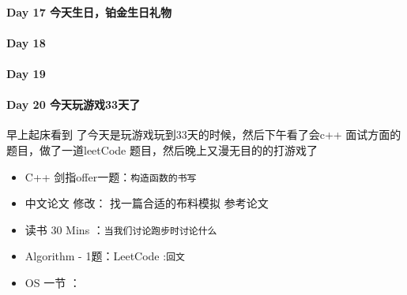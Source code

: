 \documentclass[UTF8,a4paper,8pt]{ctexart}
\begin{document}
 	 \paragraph{Day 17  今天生日，铂金生日礼物   \quad     }
 	 \paragraph{Day 18      \quad     }
 	 \paragraph{Day 19      \quad     }
 	 \paragraph{Day 20  今天玩游戏33天了    \quad     }
 	 
	 	 早上起床看到 了今天是玩游戏玩到33天的时候，然后下午看了会c++ 面试方面的题目，做了一道leetCode 题目，然后晚上又漫无目的的打游戏了
		 	 \begin{itemize}[itemindent = 1em]
		 	 	\renewcommand\labelitemi{\makebox[0pt][l]{$\square$}\hspace{1em}} 
		 	 	\renewcommand\labelitemi{\makebox[0pt][l]{$\square$}\raisebox{.15ex}{\hspace{0.1em}$\checkmark$}}	 	
		 	 	\item   C++ 剑指offer一题：\verb|构造函数的书写|
		 	 	\item   中文论文 修改： 找一篇合适的布料模拟 参考论文
		 	 	
		 	 	\item   读书  30 Mins	：\verb|当我们讨论跑步时讨论什么|
		 	 	\item   Algorithm - 1题：LeetCode :\verb|回文|	
		 	 	\renewcommand\labelitemi{\makebox[0pt][l]{$\square$}\hspace{1em}} 
		 	 	
		 	 	\item   OS  一节 ：
		 	 	
		 	 	\renewcommand\labelitemi{\makebox[0pt][l]{$\square$}\raisebox{.15ex}{\hspace{0.1em}$\checkmark$}}
		 	 \end{itemize}
\end{document}
